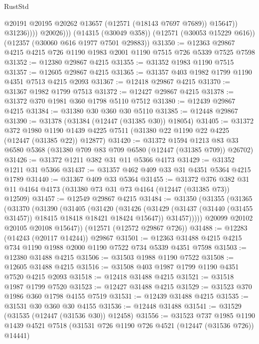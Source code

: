 \begin{lexlean}{RustStd}
\begin{coremodule}
                      @20191
                      @20195
                      @20262
                      @13657
                      (@12571 (@18143 @7697 @7689))
                      @15647))
                  @31236))))
          @20026)))
    (@14315 (@30049 @358))
    (@12571 (@30053 @15229 @616))
    (@12357 (@30060 @616 @1977 @7501 @29883))
@31350 := @12363 @29867 @4215 @4215 @726 @1190 @1983 @2001 @1190 @7515 @726 @5339 @7525 @7598
@31352 := @12380 @29867 @4215
@31355 := @31352 @1983 @1190 @7515
@31357 := @12605 @29867 @4215
@31365 := @31357 @403 @1982 @1799 @1190 @4351 @7513 @4215 @2093
@31367 := @12418 @29867 @4215
@31370 := @31367 @1982 @1799 @7513
@31372 := @12427 @29867 @4215
@31378 := @31372 @370 @1981 @360 @1798 @5110 @7512
@31380 := @12439 @29867 @4215
@31384 := @31380 @30 @360 @30 @5110
@31385 := @12448 @29867
@31390 := @31378 (@31384 (@12447 (@31385 @30)) @18054)
@31405 := @31372
    @372
    @1980
    @1190
    @1439
    @4225
    @7511
    (@31380 @22 @1190 @22 @4225 (@12447 (@31385 @22)) @12877)
@31420 := @31372
    @1594
    @1213
    @83
    @33
    @6580
    @5368
    (@31380 @709 @83 @709 @6580 (@12447 (@31385 @709)) @26702)
@31426 := @31372 @1211 @382 @31 @11 @5366 @4173
@31429 := @31352 @1211 @31 @5366
@31437 := @31357 @462 @409 @33 @31 @4351 @5364 @4215 @1789
@31440 := @31367 @409 @33 @5364
@31455 := @31372
    @376
    @382
    @31
    @11
    @4164
    @4173
    (@31380 @73 @31 @73 @4164 (@12447 (@31385 @73)) @12509)
@31457 := @12549 @29867 @4215
@31484 := @31350
    (@31355
      (@31365
        (@31370
          (@31390
            (@31405
              (@31420
                (@31426
                  (@31429 (@31437 (@31440 (@31455 @31457)) @18415 @18418 @18421 @18424 @15647))
                  @31457)))))
        @20099
        @20102
        @20105
        @20108
        @15647))
    (@12571 (@12572 @29867 @726))
@31488 := @12283 (@14243 (@20117 @14244)) @29867
@31501 := @12363 @31488 @4215 @4215 @734 @1190 @1988 @2000 @1190 @7522 @734 @5339 @4351 @7598
@31503 := @12380 @31488 @4215
@31506 := @31503 @1988 @1190 @7522
@31508 := @12605 @31488 @4215
@31516 := @31508 @403 @1987 @1799 @1190 @4351 @7520 @4215 @2093
@31518 := @12418 @31488 @4215
@31521 := @31518 @1987 @1799 @7520
@31523 := @12427 @31488 @4215
@31529 := @31523 @370 @1986 @360 @1798 @4155 @7519
@31531 := @12439 @31488 @4215
@31535 := @31531 @30 @360 @30 @4155
@31536 := @12448 @31488
@31541 := @31529 (@31535 (@12447 (@31536 @30)) @12458)
@31556 := @31523
    @737
    @1985
    @1190
    @1439
    @4521
    @7518
    (@31531 @726 @1190 @726 @4521 (@12447 (@31536 @726)) @14441)

\end{coremodule}
\end{lexlean}
